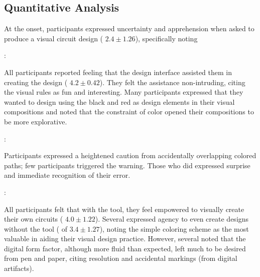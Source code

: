 \documentclass{sigchi}
\begin{document}
\subsection{Quantitative Analysis}
  At the onset, participants expressed uncertainty and apprehension when asked to produce a visual circuit design ( $2.4 \pm 1.26$), specifically noting 
  \begin{myquote}
   \vspace{-2pt}
    :
    \vspace{-2pt}
  \end{myquote}
  All participants reported feeling that the design interface assisted them in creating the design ( $4.2 \pm 0.42$). They felt the assistance non-intruding, citing the visual rules as fun and interesting. Many participants expressed that they wanted to design using the black and red as design elements in their visual compositions and noted that the constraint of color opened their compositions to be more explorative. 
    \begin{myquote}
   \vspace{-2pt}
    :
    \vspace{-2pt}
  \end{myquote}
  Participants expressed a heightened caution from accidentally overlapping colored paths; few participants triggered the warning. Those who did expressed surprise and immediate recognition of their error. 
  \begin{myquote}
   \vspace{-2pt}
    :
    \vspace{-2pt}
  \end{myquote}
  All participants felt that with the tool, they feel empowered to visually create their own circuits ( $4.0 \pm 1.22$). Several expressed agency to even create designs without the tool ( of $3.4 \pm 1.27$), noting the simple coloring scheme as the most valuable in aiding their visual design practice. However, several noted that the digital form factor, although more fluid than expected, left much to be desired from pen and paper, citing resolution and accidental markings (from digital artifacts). 
\end{document}
